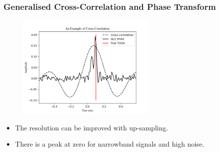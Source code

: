 \documentclass{beamer}
\begin{document}
\begin{frame}
\frametitle{Generalised Cross-Correlation and Phase Transform}

\begin{figure}[H]
\includegraphics[width=0.6\textwidth]{../Python/gcc_phat/gcc_example.png}
\centering
\end{figure}

\begin{itemize}
	\item The resolution can be improved with up-sampling.
	\item There is a peak at zero for narrowband signals and high noise.
\end{itemize}

\end{frame}
\end{document}

